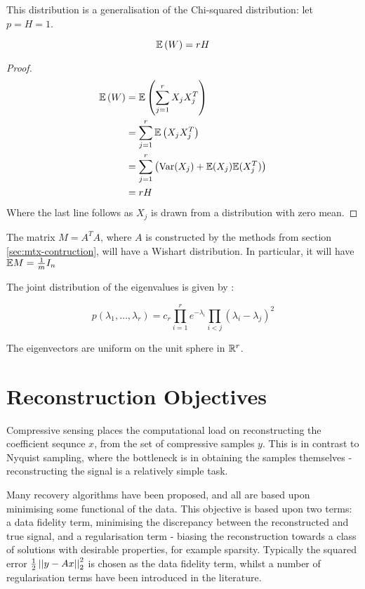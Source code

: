 \begin{remark}
This distribution is a generalisation of the Chi-squared distribution: let \(p = H = 1\). 
\end{remark}

\begin{theorem}\label{thm:wishart-mean}
\begin{equation}
{\mathbb{E}}\left(W\right) = rH
\end{equation}
\end{theorem}
\begin{proof}
\begin{align*}
{\mathbb{E}}\left(W\right) &= {\mathbb{E}}\left(\sum_{j=1}^r X_j X_j^T\right) \\
&= \sum_{j=1}^r {\mathbb{E}}\left(X_jX_j^T\right) \\
&= \sum_{j=1}^r \left( \mathrm{Var}(X_j) + {\mathbb{E}}(X_j) {\mathbb{E}}(X_j^T)   \right) \\
&= rH 
\end{align*}
Where the last line follows as \(X_j\) is drawn from a distribution with zero mean.
\end{proof}

\begin{remark}
The matrix \(M = A^TA\), where \(A\) is constructed by the methods from section \ref{sec:mtx-contruction}, will have a Wishart distribution. In particular, it will have \({\mathbb{E}} M = \frac{1}{m}I_n\) 
\label{remark: exp AtA}
\end{remark}

The joint distribution of the eigenvalues is given by \cite{levequeMatrices}:

\begin{equation}
p\left(\lambda_1, \ldots, \lambda_r\right) = c_r \prod_{i=1}^r e^{-\lambda_i}\prod_{i<j}\left(\lambda_i - \lambda_j\right)^2
\end{equation}

The eigenvectors are uniform on the unit sphere in \({\mathbb{R}}^{r}\).

\section{Reconstruction Objectives}
Compressive sensing places the computational load on reconstructing the coefficient sequnce \(x\), from the set of compressive samples \(y\). This is in contrast to Nyquist sampling, where the bottleneck is in obtaining the samples themselves - reconstructing the signal is a relatively simple task. 

Many recovery algorithms have been proposed, and all are based upon minimising some functional of the data. This objective is based upon two terms: a data fidelity term, minimising the discrepancy between the reconstructed and true signal, and a regularisation term - biasing the reconstruction towards a class of solutions with desirable properties, for example sparsity. Typically the squared error \( \frac{1}{2}\left|\left|y-Ax\right|\right|_2^2 \) is chosen as the data fidelity term, whilst a number of regularisation terms have been introduced in the literature. 

